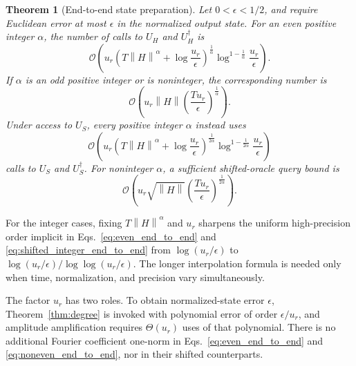 \documentclass[aps,pra,reprint,floatfix,unsortedaddress,superscriptaddress]{revtex4-2}
\newtheorem{theorem}{Theorem}[section]
\newcommand{\norm}[1]{\left\lVert#1\right\rVert}
\newcommand{\Ocal}{\mathcal{O}}
\begin{document}
\begin{theorem}[End-to-end state preparation]
\label{thm:end_to_end}
Let $0<\epsilon<1/2$, and require Euclidean error at most $\epsilon$
in the normalized output state.  For an even positive integer
$\alpha$, the number of calls to $U_H$ and $U_H^\dagger$ is
\begin{equation}
    \Ocal\!\left(
    u_r
        \left(
        T\norm{H}^{\alpha}+\log\frac{u_r}{\epsilon}
        \right)^{\frac{1}{\alpha}}
        \log^{1-\frac{1}{\alpha}}
        \frac{u_r}{\epsilon}
    \right).
    \label{eq:even_end_to_end}
\end{equation}
If $\alpha$ is an odd positive integer or is noninteger, the
corresponding number is
\begin{equation}
    \Ocal\!\left(
    u_r\norm{H}
    \left(\frac{T u_r}{\epsilon}\right)^{\frac{1}{\alpha}}
    \right).
    \label{eq:noneven_end_to_end}
\end{equation}
Under access to $U_S$, every positive integer $\alpha$ instead uses
\begin{equation}
    \Ocal\!\left(
    u_r
        \left(
        T\norm{H}^{\alpha}+\log\frac{u_r}{\epsilon}
        \right)^{\frac{1}{2\alpha}}
        \log^{1-\frac{1}{2\alpha}}
        \frac{u_r}{\epsilon}
    \right)
    \label{eq:shifted_integer_end_to_end}
\end{equation}
calls to $U_S$ and $U_S^\dagger$.  For noninteger $\alpha$, a
sufficient shifted-oracle query bound is
\begin{equation}
    \Ocal\!\left(
    u_r\sqrt{\norm{H}}
    \left(\frac{T u_r}{\epsilon}\right)^{\frac{1}{2\alpha}}
    \right).
    \label{eq:shifted_fractional_end_to_end}
\end{equation}
\end{theorem}

For the integer cases, fixing $T\norm{H}^{\alpha}$ and $u_r$ sharpens
the uniform high-precision order implicit in
Eqs.~\eqref{eq:even_end_to_end} and
\eqref{eq:shifted_integer_end_to_end} from $\log(u_r/\epsilon)$ to
$\log(u_r/\epsilon)/\log\log(u_r/\epsilon)$.  The longer interpolation
formula is needed only when time, normalization, and precision vary
simultaneously.

The factor $u_r$ has two roles.  To obtain normalized-state error
$\epsilon$, Theorem~\ref{thm:degree} is invoked with polynomial error
of order $\epsilon/u_r$, and amplitude amplification requires
$\Theta(u_r)$ uses of that polynomial.  There is no additional
Fourier coefficient one-norm in
Eqs.~\eqref{eq:even_end_to_end} and
\eqref{eq:noneven_end_to_end}, nor in their shifted counterparts.
\end{document}
